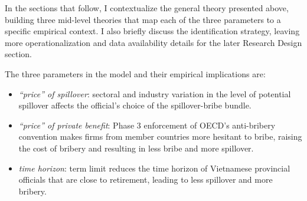 In the sections that follow, I contextualize the general theory presented above, building three mid-level theories that map each of the three parameters to a specific empirical context. I also briefly discuss the identification strategy, leaving more operationalization and data availability details for the later Research Design section.

The three parameters in the model and their empirical implications are:

\begin{itemize}
\item \textit{``price'' of spillover}: sectoral and industry variation in the level of potential spillover affects the official's choice of the spillover-bribe bundle.

\item \textit{``price'' of private benefit}: Phase 3 enforcement of OECD's anti-bribery convention makes firms from member countries more hesitant to bribe, raising the cost of bribery and resulting in less bribe and more spillover.

\item \textit{time horizon}: term limit reduces the time horizon of Vietnamese provincial officials that are close to retirement, leading to less spillover and more bribery.
\end{itemize}
